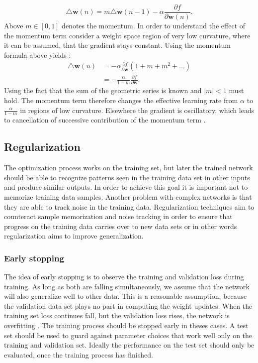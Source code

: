 \begin{equation}
\triangle \mathbf{w}(n) = m\triangle \mathbf{w}(n-1) -\alpha \frac{\partial f}{\partial \mathbf{w}(n)}.
\end{equation}
Above $m \in [0,1]$ denotes the momentum. In order to understand the effect of the momentum term consider a weight space region of very low curvature, where it can be assumed, that the gradient stays constant. Using the momentum formula above yields \cite[page 267]{Bishop1995}:
\begin{align}
\triangle \mathbf{w}(n) &= -\alpha \frac{\partial f}{\partial \mathbf{w}} (1 + m + m^2 + \dots) \\
						&= -\frac{\alpha}{ 1 - m}\frac{\partial f}{\partial \mathbf{w}}.
\end{align}
Using the fact that the sum of the geometric series is known and $|m| < 1$ must hold. The momentum term therefore changes the effective learning rate from $\alpha$ to $\frac{\alpha}{ 1 - m}$ in regions of low curvature. Elsewhere the gradient is oscillatory, which leads to cancellation of successive contribution of the momentum term \cite[page 267]{Bishop1995}.

\subsection{Regularization}
The optimization process works on the training set, but later the trained network should be able to recognize patterns seen in the training data set in other inputs and produce similar outputs. In order to achieve this goal it is important not to memorize training data samples. Another problem with complex networks is that they are able to track noise in the training data.
Regularization techniques aim to counteract sample memorization and noise tracking in order to ensure that progress on the training data carries over to new data sets or in other words regularization aims to improve generalization.

\subsubsection{Early stopping}
The idea of early stopping is to observe the training and validation loss during training. As long as both are falling simultaneously, we assume that
the network will also generalize well to other data. This is a reasonable assumption, because the validation data set plays no part in computing the weight updates. When the training set loss continues fall, but the validation loss rises, the network is overfitting \cite[page 31]{Graves2012}. The training process should be stopped early in theses cases.
A test set should be used to guard against parameter choices that work well only on the training and validation set. Ideally the performance on the test set should only be evaluated, once the training process has finished.

